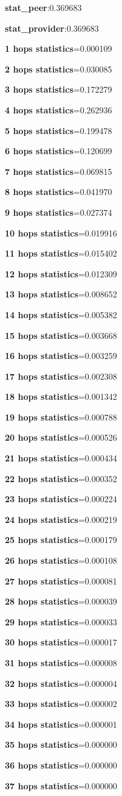 \documentclass[a4paper]{article}
\begin{document}
\textbf{stat\_peer}:0.369683

\textbf{stat\_provider}:0.369683

\textbf{1 hops statistics}=0.000109

\textbf{2 hops statistics}=0.030085

\textbf{3 hops statistics}=0.172279

\textbf{4 hops statistics}=0.262936

\textbf{5 hops statistics}=0.199478

\textbf{6 hops statistics}=0.120699

\textbf{7 hops statistics}=0.069815

\textbf{8 hops statistics}=0.041970

\textbf{9 hops statistics}=0.027374

\textbf{10 hops statistics}=0.019916

\textbf{11 hops statistics}=0.015402

\textbf{12 hops statistics}=0.012309

\textbf{13 hops statistics}=0.008652

\textbf{14 hops statistics}=0.005382

\textbf{15 hops statistics}=0.003668

\textbf{16 hops statistics}=0.003259

\textbf{17 hops statistics}=0.002308

\textbf{18 hops statistics}=0.001342

\textbf{19 hops statistics}=0.000788

\textbf{20 hops statistics}=0.000526

\textbf{21 hops statistics}=0.000434

\textbf{22 hops statistics}=0.000352

\textbf{23 hops statistics}=0.000224

\textbf{24 hops statistics}=0.000219

\textbf{25 hops statistics}=0.000179

\textbf{26 hops statistics}=0.000108

\textbf{27 hops statistics}=0.000081

\textbf{28 hops statistics}=0.000039

\textbf{29 hops statistics}=0.000033

\textbf{30 hops statistics}=0.000017

\textbf{31 hops statistics}=0.000008

\textbf{32 hops statistics}=0.000004

\textbf{33 hops statistics}=0.000002

\textbf{34 hops statistics}=0.000001

\textbf{35 hops statistics}=0.000000

\textbf{36 hops statistics}=0.000000

\textbf{37 hops statistics}=0.000000
\end{document}
